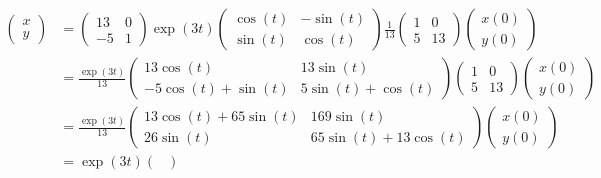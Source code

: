 \documentclass[12pt,letterpaper]{article}
\begin{document}
\begin{enumerate}[label=(\alph*)]
	      \begin{align}
		      \begin{pmatrix}
			      x \\
			      y
		      \end{pmatrix} & =
		      \begin{pmatrix}
			      13 & 0 \\
			      -5 & 1
		      \end{pmatrix}
		      \exp(3 t)\begin{pmatrix}
			      \cos( t) & -\sin( t) \\
			      \sin( t) & \cos( t)
		      \end{pmatrix}
		      \frac{1}{13}
		      \begin{pmatrix}
			      1 & 0  \\
			      5 & 13
		      \end{pmatrix}
		      \begin{pmatrix}
			      x(0) \\
			      y(0)
		      \end{pmatrix}\\
		                                  & =
		      \frac{\exp(3t)}{13}
		      \begin{pmatrix}
			      13 \cos(t)           & 13\sin(t)          \\
			      -5 \cos(t) + \sin(t) & 5\sin(t) + \cos(t)
		      \end{pmatrix}
		      \begin{pmatrix}
			      1 & 0  \\
			      5 & 13
		      \end{pmatrix}
		      \begin{pmatrix}
			      x(0) \\
			      y(0)
		      \end{pmatrix}\\
		                                  & =
		      \frac{\exp(3t)}{13}
		      \begin{pmatrix}
			      13\cos(t) + 65\sin(t) & 169 \sin(t)           \\
			      26\sin(t)             & 65\sin(t) + 13\cos(t)
		      \end{pmatrix}
		      \begin{pmatrix}
			      x(0) \\
			      y(0)
		      \end{pmatrix}\\
		                                  & =
		      \exp(3t)
		      \begin{pmatrix}

\end{pmatrix}
\end{align}
\end{enumerate}
\end{document}
